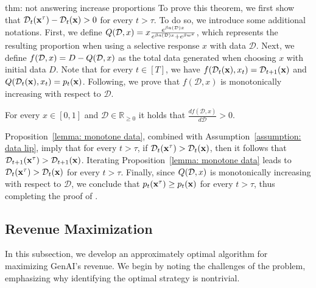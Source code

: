 \begin{sketch}{thm: not answering increase proportions}
To prove this theorem, we first show that $ \mathcal{D}_t({\bf{x}}^\tau) - \mathcal{D}_t({\bf{x}}) > 0 $ for every $ t > \tau $. To do so, we introduce some additional notations. First, we define $ Q(\mathcal{D}, x) = x \frac{e^{\beta a(\mathcal{D}) x}}{e^{\beta a(\mathcal{D}) x} + e^{\beta w^s}} $, which represents the resulting proportion when using a selective response $ x $ with data $ \mathcal{D} $. Next, we define $ f(\mathcal{D}, x) = D - Q(\mathcal{D}, x) $ as the total data generated when choosing $ x $ with initial data $ D $. Note that for every $ t \in [T] $, we have $ f(\mathcal{D}_t({\bf{x}}), x_t) = \mathcal{D}_{t+1}({\bf{x}}) $ and $ Q(\mathcal{D}_t({\bf{x}}), x_t) = p_t({\bf{x}}) $. Following, we prove that $ f(\mathcal{D}, x) $ is monotonically increasing with respect to $ \mathcal{D} $.

\begin{proposition} \label{lemma: monotone data} For every $x \in [0, 1]$ and $\mathcal{D} \in \mathbb{R}_{\geq 0}$ it holds that $\frac{df(\mathcal{D}, x)}{d\mathcal{D}} > 0$.
\end{proposition}

Proposition~\ref{lemma: monotone data}, combined with Assumption~\ref{assumption: data lip}, imply that for every $ t > \tau $, if $ \mathcal{D}_t({\bf{x}}^\tau) > \mathcal{D}_t({\bf{x}}) $, then it follows that $ \mathcal{D}_{t+1}({\bf{x}}^\tau) > \mathcal{D}_{t+1}({\bf{x}}) $. Iterating Proposition~\ref{lemma: monotone data} leads to $ \mathcal{D}_t({\bf{x}}^\tau) > \mathcal{D}_t({\bf{x}}) $ for every $ t > \tau $. Finally, since $ Q(\mathcal{D}, x) $ is monotonically increasing with respect to $ \mathcal{D} $, we conclude that $ p_t({\bf{x}}^\tau) \geq p_t({\bf{x}}) $ for every $ t > \tau $, thus completing the proof of .
\end{sketch}




\subsection{Revenue Maximization} \label{sec: GenAI revenue maximization}
In this subsection, we develop an approximately optimal algorithm for maximizing GenAI's revenue. We begin by noting the challenges of the problem, emphasizing why identifying the optimal strategy is nontrivial.

